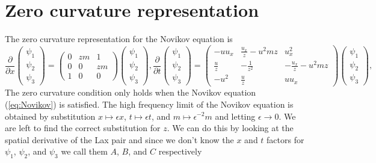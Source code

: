 \documentclass[english,master]{liumaiex}
\theoremstyle{plain}
\theoremstyle{definition}
\begin{document}
\section{Zero curvature representation} \label{sec:ZeroCurvature}

The zero curvature representation for the Novikov equation \cite{Lundmark_2022} is
\begin{subequations}
  \label{eq:Novikov-lax}
  \begin{equation}
    \label{eq:Novikov-lax-x}
    \frac{\partial}{\partial x}
    \begin{pmatrix} \psi_1 \\ \psi_2 \\ \psi_3 \end{pmatrix} =
    \begin{pmatrix}
      0 & zm & 1 \\
      0 & 0 & zm \\
      1 & 0 & 0
    \end{pmatrix}
    \begin{pmatrix} \psi_1 \\ \psi_2 \\ \psi_3 \end{pmatrix}
    ,
  \end{equation}
  \begin{equation}
    \label{eq:Novikov-lax-t}
    \frac{\partial}{\partial t}
    \begin{pmatrix} \psi_1 \\ \psi_2 \\ \psi_3 \end{pmatrix} =
    \begin{pmatrix}
      -u u_x & \frac{u_x}{z}-u^2 mz & u_x^2 \\
      \frac{u}{z} & - \frac{1}{z^2} & - \frac{u_x}{z} - u^2 mz \\
      -u^2 & \frac{u}{z} & uu_x
    \end{pmatrix}
    \begin{pmatrix} \psi_1 \\ \psi_2 \\ \psi_3 \end{pmatrix}
    ,
  \end{equation}
\end{subequations}
%
The zero curvature condition only holds when the Novikov equation (\ref{eq:Novikov}) is satisfied. The high frequency limit of the Novikov equation is obtained by substitution $x \mapsto \epsilon x$, $t \mapsto \epsilon t$, and $m \mapsto \epsilon^{-2} m$ and letting $\epsilon \rightarrow 0$. We are left to find the correct substitution for $z$. We can do this by looking at the spatial derivative of the Lax pair and since we don't know the $x$ and $t$ factors for $\psi_1$, $\psi_2$, and $\psi_3$ we call them $A$, $B$, and $C$ respectively
\end{document}
